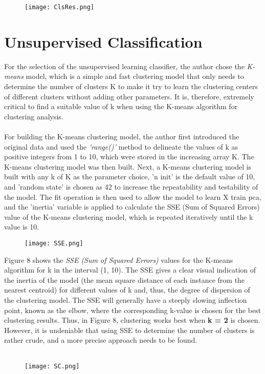 \documentclass[10pt,twocolumn]{article}
\begin{document}
	\begin{figure}[h]
		\centering
		\texttt{[image: ClsRes.png]}
		\caption{}
	\end{figure}	
	
	
	\section{Unsupervised Classification}
	For the selection of the unsupervised learning classifier, the author chose the \textit{K-means}  model, which is a simple and fast clustering model that only needs to determine the number of clusters K to make it try to learn the clustering centers of different clusters without adding other parameters. It is, therefore, extremely critical to find a suitable value of k when using the K-means algorithm for clustering analysis.
	\\ \hspace*{\fill} \\
	For building the K-means clustering model, the author first introduced the original data and used the \textit{'range()'} method to delineate the values of k as positive integers from 1 to 10, which were stored in the increasing array K. The K-means clustering model was then built. Next, a K-means clustering model is built with any k of K as the parameter choice, 'n init' is the default value of 10, and 'random state' is chosen as 42 to increase the repeatability and testability of the model. The fit operation is then used to allow the model to learn X train pca, and the 'inertia' variable is applied to calculate the SSE (Sum of Squared Errors) value of the K-means clustering model, which is repeated iteratively until the k value is 10.
	
	\begin{figure}[h]
		\centering
		\texttt{[image: SSE.png]}
		\caption{}
	\end{figure}	
	
	Figure 8 shows the \textit{SSE (Sum of Squared Errors) }values for the K-means algorithm for k in the interval (1, 10). The SSE gives a clear visual indication of the inertia of the model (the mean square distance of each instance from the nearest centroid) for different values of k and, thus, the degree of dispersion of the clustering model. The SSE will generally have a steeply slowing inflection point, known as the elbow, where the corresponding k-value is chosen for the best clustering results. Thus, in Figure 8, clustering works best when \textbf{k = 2} is chosen. However, it is undeniable that using SSE to determine the number of clusters is rather crude, and a more precise approach needs to be found.
	\\ \hspace*{\fill} \\
	\begin{figure}[h]
		\centering
		\texttt{[image: SC.png]}
		\caption{}
	\end{figure}	
	
\end{document}
